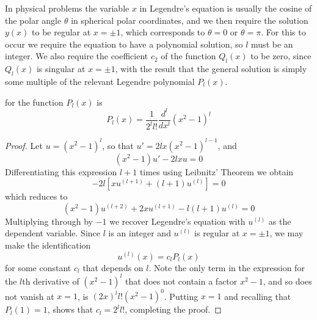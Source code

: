 \documentclass[12pt, a4paper, oneside, openright, titlepage]{book}
\begin{document}
In physical problems the variable $x$ in Legendre's equation is usually the cosine of the polar angle $\theta$ in spherical polar coordinates, and we then require the solution $y(x)$ to be regular at $x = \pm 1$, which corresponds to $\theta = 0$ or $\theta = \pi$. For this to occur we require the equation to have a polynomial solution, so $l$ must be an integer. We also require the coefficient $c_2$ of the function $Q_l(x)$ to be zero, since $Q_l(x)$ is singular at $x = \pm 1$, with the result that the general solution is simply some multiple of the relevant Legendre polynomial $P_l(x)$.

\begin{defn}
     for the function $P_l(x)$ is \begin{equation*}
        P_l(x) = \frac{1}{2^ll!}\frac{d^l}{dx^l}(x^2-1)^l
    \end{equation*}
\end{defn}
\begin{proof}
    Let $u = (x^2-1)^l$, so that $u' = 2lx(x^2-1)^{l-1}$, and \begin{equation*}
        (x^2-1)u' - 2lxu = 0
    \end{equation*}
    Differentiating this expression $l+1$ times using Leibnitz' Theorem we obtain \begin{equation*}
        [(x^2-1)u^{(l+2)} + 2x(l+2)u^{(l+1)} + l(l+1)u^{(l)}] - 2l[xu^{(l+1)} + (l+1)u^{(l)}] = 0
    \end{equation*}
    which reduces to \begin{equation*}
        (x^2-1)u^{(l+2)}+2xu^{(l+1)}-l(l+1)u^{(l)} = 0
    \end{equation*}
    Multiplying through by $-1$ we recover Legendre's equation with $u^{(l)}$ as the dependent variable. Since $l$ is an integer and $u^{(l)}$ is regular at $x = \pm 1$, we may make the identification \begin{equation*}
        u^{(l)}(x) = c_lP_l(x)
    \end{equation*}
    for some constant $c_l$ that depends on $l$. Note the only term in the expression for the $l$th derivative of $(x^2-1)^l$ that does not contain a factor $x^2-1$, and so does not vanish at $x = 1$, is $(2x)^ll!(x^2-1)^0$. Putting $x = 1$ and recalling that $P_l(1) =1$, shows that $c_l = 2^ll!$, completing the proof.
\end{proof}
\end{document}
